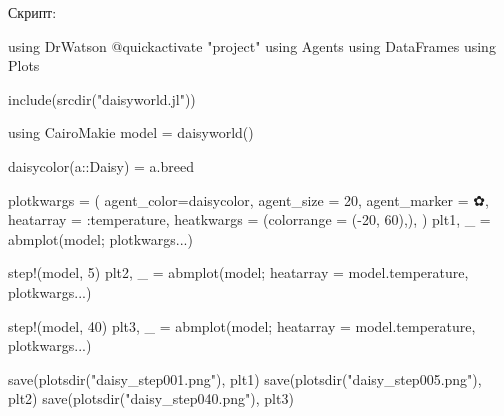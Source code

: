\documentclass[
  english,
  russian,
  12pt,
  a4paper,
  DIV=11,
  numbers=noendperiod]{scrreprt}
\newenvironment{Shaded}{\begin{snugshade}}{\end{snugshade}}
\newcommand{\BuiltInTok}[1]{\textcolor[rgb]{0.00,0.23,0.31}{#1}}
\newcommand{\CharTok}[1]{\textcolor[rgb]{0.13,0.47,0.30}{#1}}
\newcommand{\DataTypeTok}[1]{\textcolor[rgb]{0.68,0.00,0.00}{#1}}
\newcommand{\FloatTok}[1]{\textcolor[rgb]{0.68,0.00,0.00}{#1}}
\newcommand{\FunctionTok}[1]{\textcolor[rgb]{0.28,0.35,0.67}{#1}}
\newcommand{\ImportTok}[1]{\textcolor[rgb]{0.00,0.46,0.62}{#1}}
\newcommand{\NormalTok}[1]{\textcolor[rgb]{0.00,0.23,0.31}{#1}}
\newcommand{\OperatorTok}[1]{\textcolor[rgb]{0.37,0.37,0.37}{#1}}
\newcommand{\PreprocessorTok}[1]{\textcolor[rgb]{0.68,0.00,0.00}{#1}}
\newcommand{\StringTok}[1]{\textcolor[rgb]{0.13,0.47,0.30}{#1}}
\begin{document}
Скрипт:

\begin{Shaded}
\begin{Highlighting}[]
\ImportTok{using} \BuiltInTok{DrWatson}
\PreprocessorTok{@quickactivate} \StringTok{"project"}
\ImportTok{using} \BuiltInTok{Agents}
\ImportTok{using} \BuiltInTok{DataFrames}
\ImportTok{using} \BuiltInTok{Plots}


\FunctionTok{include}\NormalTok{(}\FunctionTok{srcdir}\NormalTok{(}\StringTok{"daisyworld.jl"}\NormalTok{))}

\ImportTok{using} \BuiltInTok{CairoMakie}
\NormalTok{model }\OperatorTok{=} \FunctionTok{daisyworld}\NormalTok{()}

\FunctionTok{daisycolor}\NormalTok{(a}\OperatorTok{::}\DataTypeTok{Daisy}\NormalTok{) }\OperatorTok{=}\NormalTok{ a.breed}

\NormalTok{plotkwargs }\OperatorTok{=}\NormalTok{ (}
\NormalTok{    agent\_color}\OperatorTok{=}\NormalTok{daisycolor, agent\_size }\OperatorTok{=} \FloatTok{20}\NormalTok{, agent\_marker }\OperatorTok{=} \CharTok{\textquotesingle{}✿\textquotesingle{}}\NormalTok{,}
\NormalTok{    heatarray }\OperatorTok{=} \OperatorTok{:}\NormalTok{temperature,}
\NormalTok{    heatkwargs }\OperatorTok{=}\NormalTok{ (colorrange }\OperatorTok{=}\NormalTok{ (}\OperatorTok{{-}}\FloatTok{20}\NormalTok{, }\FloatTok{60}\NormalTok{),),}
\NormalTok{)}
\NormalTok{plt1, \_ }\OperatorTok{=} \FunctionTok{abmplot}\NormalTok{(model; plotkwargs}\OperatorTok{...}\NormalTok{)}

\FunctionTok{step!}\NormalTok{(model, }\FloatTok{5}\NormalTok{)}
\NormalTok{plt2, \_ }\OperatorTok{=} \FunctionTok{abmplot}\NormalTok{(model; heatarray }\OperatorTok{=}\NormalTok{ model.temperature, plotkwargs}\OperatorTok{...}\NormalTok{)}

\FunctionTok{step!}\NormalTok{(model, }\FloatTok{40}\NormalTok{)}
\NormalTok{plt3, \_ }\OperatorTok{=} \FunctionTok{abmplot}\NormalTok{(model; heatarray }\OperatorTok{=}\NormalTok{ model.temperature, plotkwargs}\OperatorTok{...}\NormalTok{)}


\FunctionTok{save}\NormalTok{(}\FunctionTok{plotsdir}\NormalTok{(}\StringTok{"daisy\_step001.png"}\NormalTok{), plt1)}
\FunctionTok{save}\NormalTok{(}\FunctionTok{plotsdir}\NormalTok{(}\StringTok{"daisy\_step005.png"}\NormalTok{), plt2)}
\FunctionTok{save}\NormalTok{(}\FunctionTok{plotsdir}\NormalTok{(}\StringTok{"daisy\_step040.png"}\NormalTok{), plt3)}
\end{Highlighting}
\end{Shaded}
\end{document}

